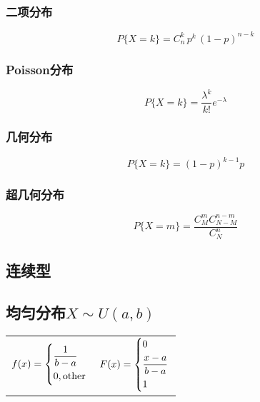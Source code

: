\subsubsection{二项分布}
\label{ssub:二项分布}

\begin{definition}[$X \sim B(n,p)$]
    \[
        P\{ X=k \} = C_n^k \,p^k\, (1-p)^{n-k}
    \]
\end{definition}

\subsubsection{Poisson分布}
\label{ssub:poisson分布}

\begin{definition}[$X \sim P(k)$]
    \[
        P\{X = k\} = \frac{\lambda^k}{k!} e^{-\lambda}
    \]
\end{definition}

\subsubsection{几何分布}
\label{ssub:几何分布}

\begin{definition}[$X \sim G(p)$]
    \[
        P\{X = k\} = (1-p)^{k-1} p
    \]
\end{definition}

\subsubsection{超几何分布}
\label{ssub:超几何分布}

\begin{definition}[$X \sim H(N, M, n$]
    \[
        P\{X = m\} = \frac{C_M^m C_{N-M}^{n-m}}{C_N^n}
    \]
\end{definition}

\subsection{连续型}
\label{sub:连续型}

\subsection{均匀分布$X \sim U(a,b)$}
\label{sub:均匀分布}

\begin{tabular}{r|l}
    $ f(x) =
    \begin{dcases}
        \frac{1}{b-a} \\
        0, \text{other}
    \end{dcases} $ & $ F(x) =
    \begin{dcases}
        0 \\
        \frac{x-a}{b-a} \\
        1
    \end{dcases} $
\end{tabular}

